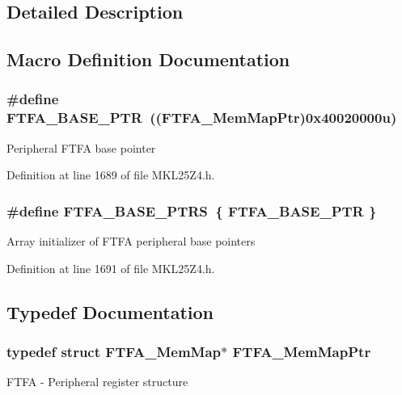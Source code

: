 \subsection{Detailed Description}


\subsection{Macro Definition Documentation}
\subsubsection[{\texorpdfstring{F\+T\+F\+A\+\_\+\+B\+A\+S\+E\+\_\+\+P\+TR}{FTFA_BASE_PTR}}]{\setlength{\rightskip}{0pt plus 5cm}\#define F\+T\+F\+A\+\_\+\+B\+A\+S\+E\+\_\+\+P\+TR~(({\bf F\+T\+F\+A\+\_\+\+Mem\+Map\+Ptr})0x40020000u)}\hypertarget{group___f_t_f_a___peripheral_ga13ad52f12d5b04e5e01f69ab18ed9216}{}\label{group___f_t_f_a___peripheral_ga13ad52f12d5b04e5e01f69ab18ed9216}
Peripheral F\+T\+FA base pointer 

Definition at line 1689 of file M\+K\+L25\+Z4.\+h.

\subsubsection[{\texorpdfstring{F\+T\+F\+A\+\_\+\+B\+A\+S\+E\+\_\+\+P\+T\+RS}{FTFA_BASE_PTRS}}]{\setlength{\rightskip}{0pt plus 5cm}\#define F\+T\+F\+A\+\_\+\+B\+A\+S\+E\+\_\+\+P\+T\+RS~\{ {\bf F\+T\+F\+A\+\_\+\+B\+A\+S\+E\+\_\+\+P\+TR} \}}\hypertarget{group___f_t_f_a___peripheral_ga3f06770a713a2c02c4eec6b98daefd7e}{}\label{group___f_t_f_a___peripheral_ga3f06770a713a2c02c4eec6b98daefd7e}
Array initializer of F\+T\+FA peripheral base pointers 

Definition at line 1691 of file M\+K\+L25\+Z4.\+h.



\subsection{Typedef Documentation}
\subsubsection[{\texorpdfstring{F\+T\+F\+A\+\_\+\+Mem\+Map\+Ptr}{FTFA_MemMapPtr}}]{\setlength{\rightskip}{0pt plus 5cm}typedef struct {\bf F\+T\+F\+A\+\_\+\+Mem\+Map}$\ast$ {\bf F\+T\+F\+A\+\_\+\+Mem\+Map\+Ptr}}\hypertarget{group___f_t_f_a___peripheral_ga49d048bbeb55a090a5ecfe86ff767884}{}\label{group___f_t_f_a___peripheral_ga49d048bbeb55a090a5ecfe86ff767884}
F\+T\+FA -\/ Peripheral register structure 